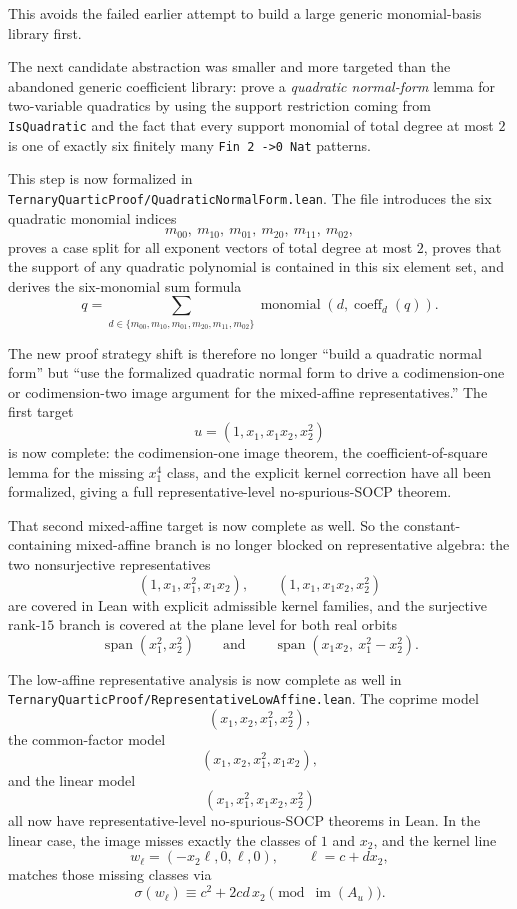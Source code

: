 \documentclass[11pt]{article}
\begin{document}
This avoids the failed earlier attempt to build a large generic monomial-basis
library first.

The next candidate abstraction was smaller and more targeted than the abandoned
generic coefficient library: prove a \emph{quadratic normal-form} lemma for
two-variable quadratics by using the support restriction coming from
\texttt{IsQuadratic} and the fact that every support monomial of total degree
at most $2$ is one of exactly six finitely many \texttt{Fin 2 ->0 Nat} patterns.

This step is now formalized in
\texttt{TernaryQuarticProof/QuadraticNormalForm.lean}. The file introduces the
six quadratic monomial indices
\[
  m_{00},\ m_{10},\ m_{01},\ m_{20},\ m_{11},\ m_{02},
\]
proves a case split for all exponent vectors of total degree at most $2$,
proves that the support of any quadratic polynomial is contained in this six
element set, and derives the six-monomial sum formula
\[
  q = \sum_{d \in \{m_{00},m_{10},m_{01},m_{20},m_{11},m_{02}\}}
      \operatorname{monomial}(d,\operatorname{coeff}_d(q)).
\]

The new proof strategy shift is therefore no longer ``build a quadratic normal
form'' but ``use the formalized quadratic normal form to drive a codimension-one
or codimension-two image argument for the mixed-affine representatives.'' The
first target
\[
  u = (1,x_1,x_1x_2,x_2^2)
\]
is now complete: the codimension-one image theorem, the coefficient-of-square
lemma for the missing $x_1^4$ class, and the explicit kernel correction have
all been formalized, giving a full representative-level no-spurious-SOCP
theorem.

That second mixed-affine target is now complete as well. So the constant-
containing mixed-affine branch is no longer blocked on representative algebra:
the two nonsurjective representatives
\[
  (1,x_1,x_1^2,x_1x_2),\qquad
  (1,x_1,x_1x_2,x_2^2)
\]
are covered in Lean with explicit admissible kernel families, and the surjective
rank-$15$ branch is covered at the plane level for both real orbits
\[
  \operatorname{span}(x_1^2,x_2^2)
  \qquad\text{and}\qquad
  \operatorname{span}(x_1x_2,\ x_1^2-x_2^2).
\]

The low-affine representative analysis is now complete as well in
\texttt{TernaryQuarticProof/RepresentativeLowAffine.lean}. The coprime model
\[
  (x_1,x_2,x_1^2,x_2^2),
\]
the common-factor model
\[
  (x_1,x_2,x_1^2,x_1x_2),
\]
and the linear model
\[
  (x_1,x_1^2,x_1x_2,x_2^2)
\]
all now have representative-level no-spurious-SOCP theorems in Lean. In the
linear case, the image misses exactly the classes of $1$ and $x_2$, and the
kernel line
\[
  w_\ell = (-x_2\ell,0,\ell,0), \qquad \ell = c + d x_2,
\]
matches those missing classes via
\[
  \sigma(w_\ell) \equiv c^2 + 2cd\,x_2 \pmod{\operatorname{im}(A_u)}.
\]
\end{document}
